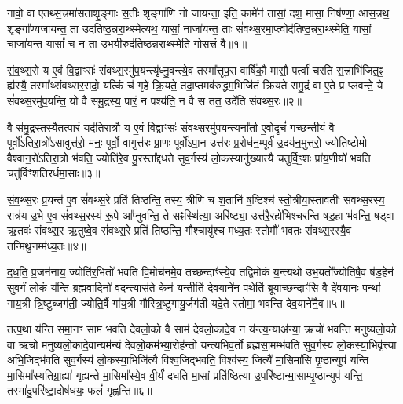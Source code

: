 \setcounter{anuvakam}{0}
गावो॒ वा ए॒तथ्स॒त्त्रमा॑सताशृ॒ङ्गाः स॒तीः शृङ्गा॑णि नो जायन्ता॒ इति॒ कामे॑न॑ तासां॒ दश॒ मासा॒ निष॑ण्णा॒ आस॒न्नथ॒ शृङ्गा᳚ण्यजायन्त॒ ता उद॑तिष्ठ॒न्नरा॒थ्स्मेत्यथ॒ यासां॒ नाजा॑यन्त॒ ताः सं॑वथ्स॒रमा॒प्त्वोद॑तिष्ठ॒न्नरा॒थ्स्मेति॒ यासां॒ चाजा॑यन्त॒ यासां᳚ च॒ न ता उ॒भयी॒रुद॑तिष्ठ॒न्नरा॒थ्स्मेति॑ गोस॒त्त्रं वै॥१॥

सं॒व॒थ्स॒रो य ए॒वं वि॒द्वाꣳसः॑ संवथ्स॒रमु॑प॒यन्त्यृ॑ध्नु॒वन्त्ये॒व तस्मा᳚त्तूप॒रा वार्\mbox{}षि॑कौ॒ मासौ॒ पर्त्वा॑ चरति स॒त्त्राभि॑जित॒ꣴ॒ ह्य॑स्यै॒ तस्मा᳚थ्संवथ्सर॒सदो॒ यत्किं च॑ गृ॒हे क्रि॒यते॒ तदा॒प्तमव॑रुद्धम॒भिजि॑तं क्रियते समु॒द्रं वा ए॒ते प्र प्ल॑वन्ते॒ ये सं॑वथ्स॒रमु॑प॒यन्ति॒ यो वै स॑मु॒द्रस्य॒ पारं॒ न पश्य॑ति॒ न वै स तत॒ उदे॑ति संवथ्स॒रः॥२॥

वै स॑मु॒द्रस्तस्यै॒तत्पा॒रं यद॑तिरा॒त्रौ य ए॒वं वि॒द्वाꣳसः॑ संवथ्स॒रमु॑प॒यन्त्यना᳚र्ता ए॒वोदृचं॑ गच्छन्ती॒यं वै पूर्वो॑\-ऽतिरा॒त्रो॑\-ऽ\-सावुत्त॑रो॒ मनः॒ पूर्वो॒ वागुत्त॑रः प्रा॒णः पूर्वो॑\-ऽपा॒न उत्त॑रः प्र॒रोध॑न॒म्पूर्व॑ उ॒दय॑न॒मुत्त॑रो॒ ज्योति॑ष्टोमो वैश्वान॒रो॑\-ऽतिरा॒त्रो भ॑वति॒ ज्योति॑रे॒व पु॒रस्ता᳚द्दधते सुव॒र्गस्य॑ लो॒कस्यानु॑ख्यात्यै चतुर्वि॒ꣳ॒शः प्रा॑य॒णीयो॑ भवति चतु॑र्विꣳशतिरर्धमा॒साः॥३॥

सं॒व॒थ्स॒रः प्र॒यन्त॑ ए॒व सं॑वथ्स॒रे प्रति॑ तिष्ठन्ति॒ तस्य॒ त्रीणि॑ च श॒तानि॑ ष॒ष्टिश्च॑ स्तो॒त्रीया॒स्ताव॑तीः संवथ्स॒रस्य॒ रात्र॑य उ॒भे ए॒व सं॑वथ्स॒रस्य॑ रू॒पे आ᳚प्नुवन्ति॒ ते सꣴस्थि॑त्या॒ अरि॑ष्ट्या॒ उत्त॑रै॒रहो॑भिश्चरन्ति षड॒हा भ॑वन्ति॒ षड्वा ऋ॒तवः॑ संवथ्स॒र ऋ॒तुष्वे॒व सं॑वथ्स॒रे प्रति॑ तिष्ठन्ति॒ गौश्चायु॑श्च मध्य॒तः स्तोमौ॑ भवतः संवथ्स॒रस्यै॒व तन्मि॑थु॒नम्म॑ध्य॒तः॥४॥

द॒ध॒ति॒ प्र॒जन॑नाय॒ ज्योति॑र॒भितो॑ भवति वि॒मोच॑नमे॒व तच्छन्दाꣳ॑स्ये॒व तद्वि॒मोकं॑ य॒न्त्यथो॑ उभ॒यतो᳚ज्योतिषै॒व ष॑ड॒हेन॑ सुव॒र्गं लो॒कं य॑न्ति ब्रह्मवा॒दिनो॑ वद॒न्त्यास॑ते॒ केन॑ य॒न्तीति॑ देव॒याने॑न प॒थेति॑ ब्रूया॒च्छन्दाꣳ॑सि॒ वै दे॑व॒यानः॒ पन्था॑ गाय॒त्री त्रि॒ष्टुब्जग॑ती॒ ज्योति॒र्वै गा॑य॒त्री गौस्त्रि॒ष्टुगायु॒र्जग॑ती यदे॒ते स्तोमा॒ भव॑न्ति देव॒याने॑नै॒व॥५॥

तत्प॒था य॑न्ति समा॒नꣳ साम॑ भवति देवलो॒को वै साम॑ देवलो॒कादे॒व न य॑न्त्य॒न्याअ॑न्या॒ ऋचो॑ भवन्ति मनुष्यलो॒को वा ऋचो॑ मनुष्यलो॒कादे॒वान्यम॑न्यं देवलो॒कम॑भ्या॒रोह॑न्तो यन्त्यभिव॒र्तो ब्र॑ह्मसा॒मम्भ॑वति सुव॒र्गस्य॑ लो॒कस्या॒भिवृ॑त्त्या अभि॒जिद्भ॑वति सुव॒र्गस्य॑ लो॒कस्या॒भिजि॑त्यै विश्व॒जिद्भ॑वति॒ विश्व॑स्य॒ जित्यै॑ मा॒सिमा॑सि पृ॒ष्ठान्युप॑ यन्ति मा॒सिमा᳚स्यतिग्रा॒ह्या॑ गृह्यन्ते मा॒सिमा᳚स्ये॒व वी॒र्यं॑ दधति मा॒सां प्रति॑ष्ठित्या उ॒परि॑ष्टान्मा॒साम्पृ॒ष्ठान्युप॑ यन्ति॒ तस्मा॑दु॒परि॑ष्टा॒दोष॑धयः॒ फलं॑ गृह्णन्ति॥६॥

